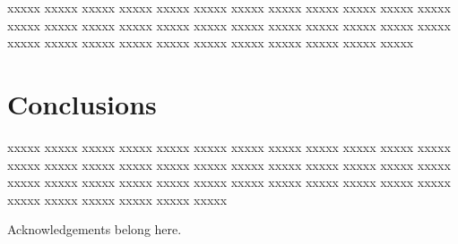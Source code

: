 \documentclass{article}
\begin{document}
xxxxx xxxxx xxxxx xxxxx xxxxx xxxxx xxxxx
xxxxx xxxxx xxxxx xxxxx xxxxx xxxxx xxxxx
xxxxx xxxxx xxxxx xxxxx xxxxx xxxxx xxxxx
xxxxx xxxxx xxxxx xxxxx xxxxx xxxxx xxxxx
xxxxx xxxxx xxxxx xxxxx xxxxx xxxxx xxxxx

\section{Conclusions}

xxxxx xxxxx xxxxx xxxxx xxxxx xxxxx xxxxx
xxxxx xxxxx xxxxx xxxxx xxxxx xxxxx xxxxx
xxxxx xxxxx xxxxx xxxxx xxxxx xxxxx xxxxx
xxxxx xxxxx xxxxx xxxxx xxxxx xxxxx xxxxx
xxxxx xxxxx xxxxx xxxxx xxxxx xxxxx xxxxx
xxxxx xxxxx xxxxx xxxxx xxxxx xxxxx xxxxx

\begin{acknowledgement}
Acknowledgements belong here.
\end{acknowledgement}

\nocite{*}


\end{document}
